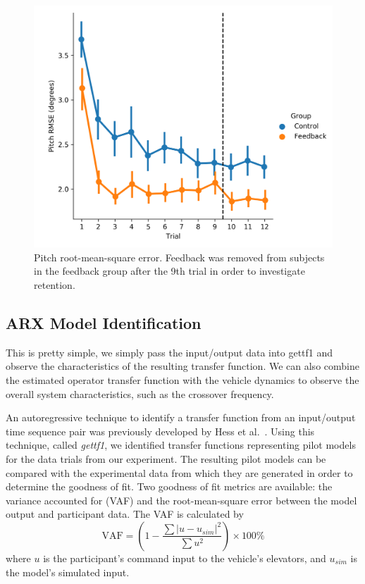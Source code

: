 \begin{figure}[t]
    \centering
    \includegraphics[width=0.8\linewidth]{figures/Modeling/prms_arx.png}
    \caption[Pitch root-mean-square error]{Pitch root-mean-square error. Feedback was removed from subjects in the feedback group after the 9th trial in order to investigate retention.}
    \label{fig:prmse}
\end{figure}

\subsection{ARX Model Identification}
This is pretty simple, we simply pass the input/output data into gettf1 and observe the characteristics of the resulting transfer function.
We can also combine the estimated operator transfer function with the vehicle dynamics to observe the overall system characteristics, such as the crossover frequency.

An autoregressive technique to identify a transfer function from an input/output time sequence pair was previously developed by Hess et al.~\citet{hess_modeling_2002}.
Using this technique, called \textit{gettf1}, we identified transfer functions representing pilot models for the data trials from our experiment.
The resulting pilot models can be compared with the experimental data from which they are generated in order to determine the goodness of fit.
Two goodness of fit metrics are available: the variance accounted for (VAF) and the root-mean-square error between the model output and participant data.
The VAF is calculated by
\begin{equation}
    \mbox{VAF} = \left( 1 - \dfrac{\sum{|u - u_{sim}|^2}} {\sum{u^2}} \right) \times \mbox{100\%}
\end{equation}
where $u$ is the participant's command input to the vehicle's elevators, and $u_{sim}$ is the model's simulated input.

